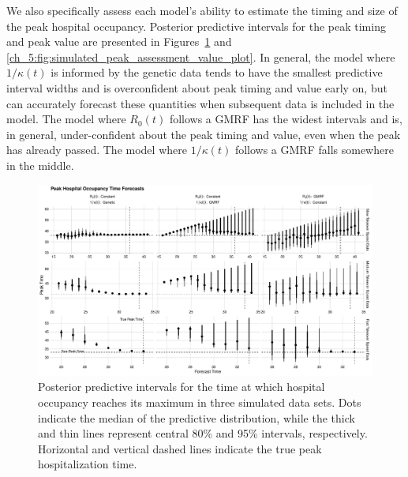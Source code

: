 We also specifically assess each model's ability to estimate the timing and size of the peak hospital occupancy.
Posterior predictive intervals for the peak timing and peak value are presented in Figures~\ref{ch_5:fig:simulated_peak_assessment_time_plot} and \ref{ch_5:fig:simulated_peak_assessment_value_plot}.
In general, the model where \( 1 / \kappa(t) \) is informed by the genetic data tends to have the smallest predictive interval widths and is overconfident about peak timing and value early on, but can accurately forecast these quantities when subsequent data is included in the model.
The model where \( R_0(t) \) follows a GMRF has the widest intervals and is, in general, under-confident about the peak timing and value, even when the peak has already passed.
The model where \( 1 / \kappa(t) \) follows a GMRF falls somewhere in the middle.

\begin{figure}
    \centering
    \includegraphics[width=1.0\columnwidth]{simulated_peak_assessment_time_plot}
    \caption[Posterior predictive intervals for peak hospital occupancy timing for simulated data sets.]{Posterior predictive intervals for the time at which hospital occupancy reaches its maximum in three simulated data sets.
    Dots indicate the median of the predictive distribution, while the thick and thin lines represent central 80\% and 95\% intervals, respectively.
    Horizontal and vertical dashed lines indicate the true peak hospitalization time.}
    \label{ch_5:fig:simulated_peak_assessment_time_plot}
\end{figure}

